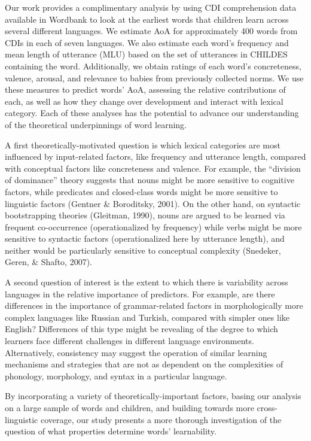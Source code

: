 \documentclass[10pt, letterpaper]{article}
\begin{document}
Our work provides a complimentary analysis by using CDI comprehension
data available in Wordbank to look at the earliest words that children
learn across several different languages. We estimate AoA for
approximately 400 words from CDIs in each of seven languages. We also
estimate each word's frequency and mean length of utterance (MLU) based
on the set of utterances in CHILDES containing the word. Additionally,
we obtain ratings of each word's concreteness, valence, arousal, and
relevance to babies from previously collected norms. We use these
measures to predict words' AoA, assessing the relative contributions of
each, as well as how they change over development and interact with
lexical category. Each of these analyses has the potential to advance
our understanding of the theoretical underpinnings of word learning.

A first theoretically-motivated question is which lexical categories are
most influenced by input-related factors, like frequency and utterance
length, compared with conceptual factors like concreteness and valence.
For example, the ``division of dominance'' theory suggests that nouns
might be more sensitive to cognitive factors, while predicates and
closed-class words might be more sensitive to linguistic factors
(Gentner \& Boroditsky, 2001). On the other hand, on syntactic
bootstrapping theories (Gleitman, 1990), nouns are argued to be learned
via frequent co-occurrence (operationalized by frequency) while verbs
might be more sensitive to syntactic factors (operationalized here by
utterance length), and neither would be particularly sensitive to
conceptual complexity (Snedeker, Geren, \& Shafto, 2007).

A second question of interest is the extent to which there is
variability across languages in the relative importance of predictors.
For example, are there differences in the importance of grammar-related
factors in morphologically more complex languages like Russian and
Turkish, compared with simpler ones like English? Differences of this
type might be revealing of the degree to which learners face different
challenges in different language environments. Alternatively,
consistency may suggest the operation of similar learning mechanisms and
strategies that are not as dependent on the complexities of phonology,
morphology, and syntax in a particular language.

By incorporating a variety of theoretically-important factors, basing
our analysis on a large sample of words and children, and building
towards more cross-linguistic coverage, our study presents a more
thorough investigation of the question of what properties determine
words' learnability.
\end{document}
